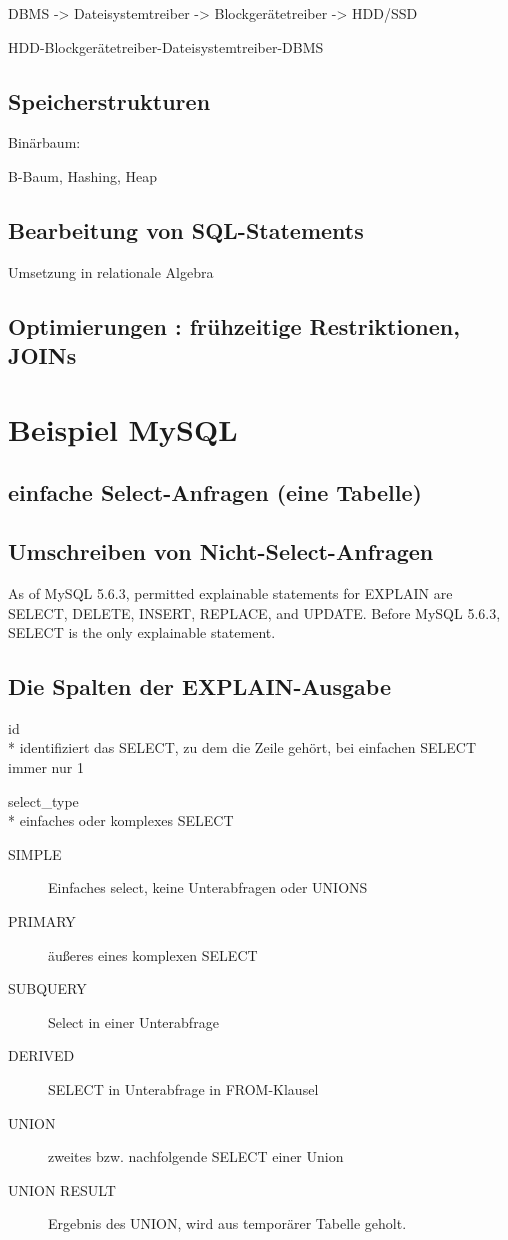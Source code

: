 DBMS -> Dateisystemtreiber -> Blockgerätetreiber -> HDD/SSD 

 HDD-Blockgerätetreiber-Dateisystemtreiber-DBMS

\subsection{Speicherstrukturen}
 Binärbaum:

 B-Baum, Hashing, Heap

\subsection{Bearbeitung von SQL-Statements}
 Umsetzung in relationale Algebra

\subsection{Optimierungen : frühzeitige Restriktionen, JOINs}


\section{Beispiel MySQL}

\subsection{einfache Select-Anfragen (eine Tabelle)}

\subsection{Umschreiben von Nicht-Select-Anfragen}
As of MySQL 5.6.3, permitted explainable statements for EXPLAIN are SELECT, 
DELETE, INSERT, REPLACE, and UPDATE. Before MySQL 5.6.3, SELECT is the only explainable statement.
\cite{refman1}

\subsection{Die Spalten der EXPLAIN-Ausgabe}
id\\*
identifiziert das SELECT, zu dem die Zeile gehört, bei einfachen SELECT immer nur 1

select\_type\\*
einfaches oder komplexes SELECT
\begin{description}
	\item[SIMPLE] Einfaches select, keine Unterabfragen oder UNIONS
	\item[PRIMARY] äußeres eines komplexen SELECT
	\item[SUBQUERY] Select in einer Unterabfrage
	\item[DERIVED] SELECT in Unterabfrage in FROM-Klausel
	\item[UNION] zweites bzw. nachfolgende SELECT einer Union
	\item[UNION RESULT] Ergebnis des UNION, wird aus temporärer Tabelle geholt.
\end{description}


